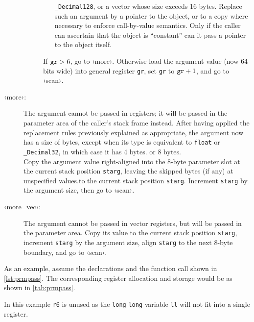 \documentclass[english,11pt,twoside,toc=bib,toc=idx]{scrreprt}
\newcommand{\jumplabel}[1]{\textsf{‹#1›}}
\newcommand{\NBITS}{64}
\newcommand{\NBYTES}{8}
\newcommand{\NBITS}{32}
\newcommand{\NBYTES}{4}
\begin{document}
\begin{description}
\begin{description}
\begin{itemize}
      \texttt{\_Decimal128}, or a vector whose size exceeds 16 bytes.
      Replace such an argument by a pointer to the object, or to a copy
      where necessary to enforce call-by-value semantics.  Only if the
      caller can ascertain that the object is ``constant'' can it pass a
      pointer to the object itself.
    \end{itemize}
    If $\mbox{\texttt{gr}}>6$, go to \jumplabel{more}.  Otherwise load the
    argument value (now \NBITS{} bits wide) into general register
    \texttt{gr}, set \texttt{gr} to $\mbox{\texttt{gr}}+1$, and go to
    \jumplabel{scan}.
  \end{description}
\item[\jumplabel{more}:] The argument cannot be passed in registers; it
  will be passed in the parameter area of the caller's stack frame
  instead.  After having applied the replacement rules previously
  explained as appropriate, the argument now has a size of {
    bytes, except when its type is equivalent to \texttt{float} or
    \texttt{\_Decimal32}, in which case it has 4 bytes. or 8
    bytes.\fi}%
  \\
  Copy the argument value {\ifzseries right-aligned into the 8-byte
    parameter slot at the current stack position \texttt{starg}, leaving
    the skipped bytes (if any) at unspecified values.\else to the current
    stack position \texttt{starg}.\fi} Increment \texttt{starg} by
  {\else the argument size\fi}, then go to \jumplabel{scan}.
\item[\jumplabel{more\_vec}:] The argument cannot be passed in vector
  registers, but will be passed in the parameter area.  Copy its value to
  the current stack position \texttt{starg}, increment \texttt{starg} by
  the argument size, align \texttt{starg} to the next \NBYTES{}-byte
  boundary, and go to \jumplabel{scan}.
\end{description}

As an example, assume the declarations and the function call shown in
\cref{lst:prmpass}.  The corresponding register allocation and
storage would be as shown in \cref{tab:prmpass}.

\ifzseries\else In this example \texttt{r6} is unused as the \texttt{long}
\texttt{long} variable \texttt{ll} will not fit into a single register.\fi
\end{document}
